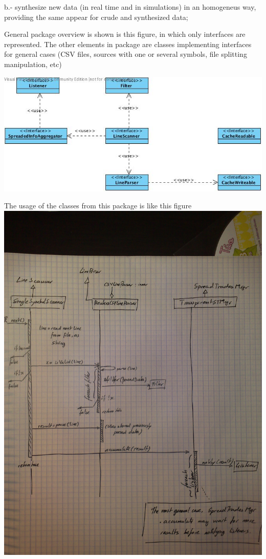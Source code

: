 \documentclass[11pt,a4paper]{article}
\begin{document}
    b.- synthesize new data (in real time and in simulations) in an homogeneus
        way, providing the same appear for crude and synthesized data;

General package overview is shown is this figure, in which only interfaces
are represented. The other elements in package are classes implementing
interfaces for general cases (CSV files, sources with one or several symbols,
file splitting manipulation, etc)

\includegraphics{images/datamgrClassDiagram.jpg}

The usage of the classes from this package is like this figure
\includegraphics{images/datamgrsequence.jpg}
\end{document}
